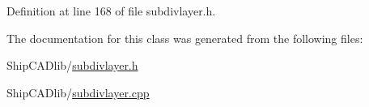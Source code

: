 Definition at line 168 of file subdivlayer.\+h.



The documentation for this class was generated from the following files\+:\begin{DoxyCompactItemize}
\item 
Ship\+C\+A\+Dlib/\hyperlink{subdivlayer_8h}{subdivlayer.\+h}\item 
Ship\+C\+A\+Dlib/\hyperlink{subdivlayer_8cpp}{subdivlayer.\+cpp}\end{DoxyCompactItemize}
